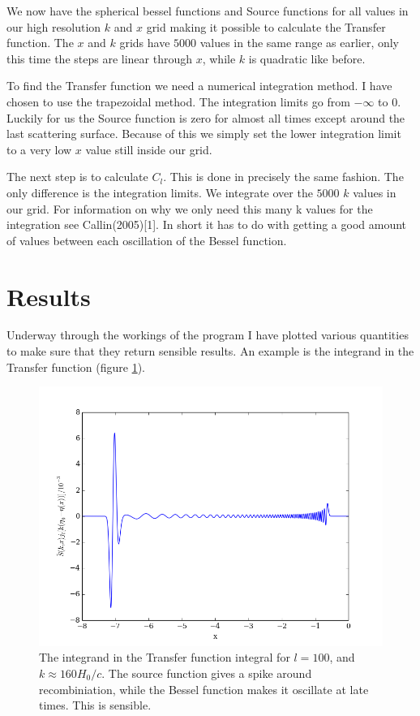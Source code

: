 \documentclass[a4paper]{report}
\begin{document}
We now have the spherical bessel functions and Source functions for all values in our high resolution $k$ and $x$ grid making it possible to calculate the Transfer function. The $x$ and $k$ grids have $5000$ values in the same range as earlier, only this time the steps are linear through $x$, while $k$ is quadratic like before.

To find the Transfer function we need a numerical integration method. I have chosen to use the trapezoidal method. The integration limits go from $-\infty$ to $0$. Luckily for us the Source function is zero for almost all times except around the last scattering surface. Because of this we simply set the lower integration limit to a very low $x$ value still inside our grid.

The next step is to calculate $C_l$. This is done in precisely the same fashion. The only difference is the integration limits. We integrate over the $5000$ $k$ values in our grid. For information on why we only need this many k values for the integration see Callin(2005)[1]. In short it has to do with getting a good amount of values between each oscillation of the  Bessel function. 



\section{Results}\label{sec:results}
Underway through the workings of the program I have plotted various quantities to make sure that they return sensible results. An example is the integrand in the Transfer function (figure \ref{fig:integrand}).

\begin{figure}[ht]
 \includegraphics[width=\textwidth]{integrand.png}
 \caption{The integrand in the Transfer function integral for $l= 100$, and $k \approx160H_0/c$. The source function gives a spike around recombiniation, while the Bessel function makes it oscillate at late times. This is sensible.}
 \label{fig:integrand}
\end{figure}
\end{document}
